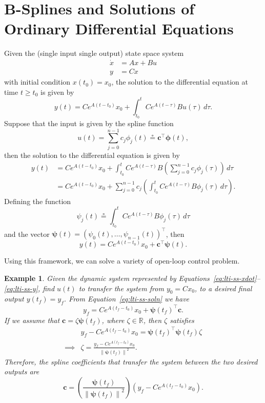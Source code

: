 \documentclass{article}
\newtheorem{example}[theorem]{Example}
\newcommand{\norm}[1]{\left\|{#1}\right\|}
\newcommand{\defeq}{\circeq}
\newcommand{\cbf}{\mathbf{c}}
\begin{document}
\section{B-Splines and Solutions of Ordinary Differential Equations}
Given the (single input single output) state space system
\begin{align}
\dot{x} &= Ax + Bu \label{eq:lti-ss-xdot} \\
y &= Cx \label{eq:lti-ss-y}
\end{align}
with initial condition $x(t_0)=x_0$, the solution to the differential equation at time $t\geq t_0$ is given by
\[
y(t) = Ce^{A(t-t_0)}x_0 + \int_{t_0}^t Ce^{A(t-\tau)} B u(\tau) \, d\tau.
\]
Suppose that the input is given by the spline function
\[
u(t) = \sum_{j=0}^{n-1} c_j \phi_j(t) \defeq \cbf^\top \boldsymbol{\phi}(t),
\]
then the solution to the differential equation is given by
\begin{align*}
	y(t) &= Ce^{A(t-t_0)}x_0 + \int_{t_0}^t Ce^{A(t-\tau)} B \left(\sum_{j=0}^{n-1} c_j \phi_j(\tau)\right) \, d\tau \\
	     &= Ce^{A(t-t_0)}x_0 + \sum_{j=0}^{n-1} c_j \left(\int_{t_0}^t Ce^{A(t-\tau)} B \phi_j(\tau)\, d\tau \right).
\end{align*}
Defining the function
\[
\psi_j(t) \defeq \int_{t_0}^t Ce^{A(t-\tau)} B \phi_j(\tau)\, d\tau
\]
and the vector $\boldsymbol{\psi}(t) = (\psi_0(t), \dots, \psi_{n-1}(t))^\top$, then
\begin{equation} \label{eq:lti-ss-soln}
y(t) = Ce^{A(t-t_0)}x_0 + \cbf^\top \boldsymbol{\psi}(t).
\end{equation}

Using this framework, we can solve a variety of open-loop control problem.
\begin{example}
Given the dynamic system represented by Equations~\eqref{eq:lti-ss-xdot}--\eqref{eq:lti-ss-y}, find $u(t)$ to transfer the system from $y_0=Cx_0$, to a desired final output $y(t_f)=y_f$.  From Equation~\eqref{eq:lti-ss-soln} we have
\[
y_f = Ce^{A(t_f-t_0)}x_0 + \boldsymbol{\psi}(t_f)^\top \cbf.
\]
If we assume that $\cbf = \zeta \boldsymbol{\psi}(t_f)$, where $\zeta\in\mathbb{R}$, then $\zeta$ satisfies
\begin{align*}
	& y_f - Ce^{A(t_f-t_0)}x_0 = \boldsymbol{\psi}(t_f)^\top \boldsymbol{\psi}(t_f) \zeta \\
	\implies & \zeta = \frac{y_f - Ce^{A(t_f-t_0)}x_0}{\norm{\boldsymbol{\psi}(t_f)}^2}.
\end{align*}
Therefore, the spline coefficients that transfer the system between the two desired outputs are
\[
\cbf = \left(\frac{\boldsymbol{\psi}(t_f)}{\norm{\boldsymbol{\psi}(t_f)}^2}\right) \left(y_f - Ce^{A(t_f-t_0)}x_0 \right).
\]
\end{example}
\end{document}

